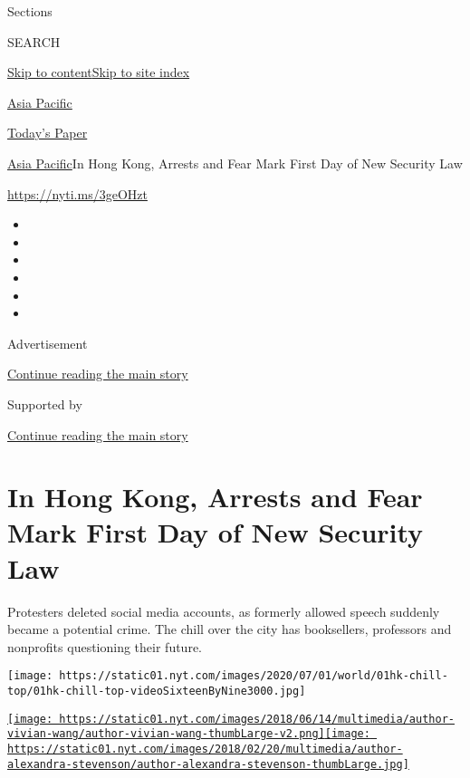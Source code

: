 Sections

SEARCH

\protect\hyperlink{site-content}{Skip to
content}\protect\hyperlink{site-index}{Skip to site index}

\href{https://www.nytimes.com/section/world/asia}{Asia Pacific}

\href{https://myaccount.nytimes.com/auth/login?response_type=cookie\&client_id=vi}{}

\href{https://www.nytimes.com/section/todayspaper}{Today's Paper}

\href{/section/world/asia}{Asia Pacific}\textbar{}In Hong Kong, Arrests
and Fear Mark First Day of New Security Law

\url{https://nyti.ms/3geOHzt}

\begin{itemize}
\item
\item
\item
\item
\item
\item
\end{itemize}

Advertisement

\protect\hyperlink{after-top}{Continue reading the main story}

Supported by

\protect\hyperlink{after-sponsor}{Continue reading the main story}

\hypertarget{in-hong-kong-arrests-and-fear-mark-first-day-of-new-security-law}{%
\section{In Hong Kong, Arrests and Fear Mark First Day of New Security
Law}\label{in-hong-kong-arrests-and-fear-mark-first-day-of-new-security-law}}

Protesters deleted social media accounts, as formerly allowed speech
suddenly became a potential crime. The chill over the city has
booksellers, professors and nonprofits questioning their future.

\texttt{[image: https://static01.nyt.com/images/2020/07/01/world/01hk-chill-top/01hk-chill-top-videoSixteenByNine3000.jpg]}

\href{https://www.nytimes.com/by/vivian-wang}{\texttt{[image: https://static01.nyt.com/images/2018/06/14/multimedia/author-vivian-wang/author-vivian-wang-thumbLarge-v2.png]}}\href{https://www.nytimes.com/by/alexandra-stevenson}{\texttt{[image: https://static01.nyt.com/images/2018/02/20/multimedia/author-alexandra-stevenson/author-alexandra-stevenson-thumbLarge.jpg]}}

